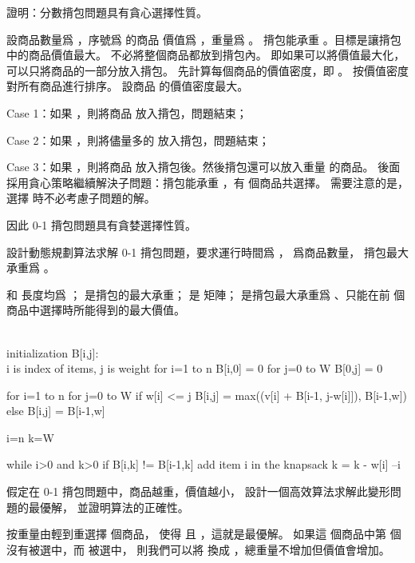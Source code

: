 \startsection[
  title={Elements of the greedy strategy},
]

\startEXERCISE
證明：分數揹包問題具有貪心選擇性質。
\stopEXERCISE

\startANSWER
設商品數量爲 ，序號爲  的商品
價值爲 ，重量爲 。
揹包能承重 。目標是讓揹包中的商品價值最大。
不必將整個商品都放到揹包內。
即如果可以將價值最大化，可以只將商品的一部分放入揹包。
先計算每個商品的價值密度，即 。
按價值密度對所有商品進行排序。
設商品  的價值密度最大。

\startigBase[n]
\item Case 1：如果 ，則將商品  放入揹包，問題結束；
\item Case 2：如果 ，則將儘量多的  放入揹包，問題結束；
\item Case 3：如果 ，則將商品  放入揹包後。然後揹包還可以放入重量  的商品。
後面採用貪心策略繼續解決子問題：揹包能承重 ，有  個商品共選擇。
需要注意的是，選擇  時不必考慮子問題的解。
\stopigBase

因此 0-1 揹包問題具有貪婪選擇性質。
\stopANSWER

\startEXERCISE[exercise:16.2-2]
設計動態規劃算法求解 0-1 揹包問題，要求運行時間爲 ，  爲商品數量，
揹包最大承重爲 。
\stopEXERCISE

\startANSWER
{} 和  長度均爲 ；
  是揹包的最大承重；
  是  矩陣；
  是揹包最大承重爲 、只能在前  個商品中選擇時所能得到的最大價值。

\startCLRS
\\ initialization B[i,j]:
\\ i is index of items, j is weight
for i=1 to n
	B[i,0] = 0
for j=0 to W
	B[0,j] = 0

for i=1 to n
	for j=0 to W
		if w[i] <= j
			B[i,j] = max((v[i] + B[i-1, j-w[i]]), B[i-1,w])
		else
			B[i,j] = B[i-1,w]
\stopCLRS

\startCLRS
i=n
k=W

while i>0 and k>0
	if B[i,k] != B[i-1,k]
		add item i in the knapsack
		k = k - w[i]
	--i
\stopCLRS

\stopANSWER

\startEXERCISE
假定在 0-1 揹包問題中，商品越重，價值越小，
設計一個高效算法求解此變形問題的最優解，
並證明算法的正確性。
\stopEXERCISE

\startANSWER
按重量由輕到重選擇  個商品，
使得  且 ，這就是最優解。
如果這  個商品中第  個沒有被選中，而  被選中，
則我們可以將  換成 ，總重量不增加但價值會增加。
\stopANSWER

